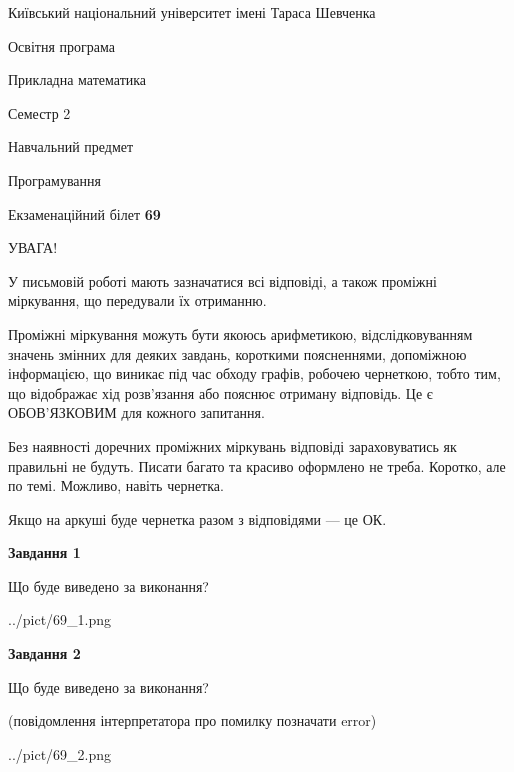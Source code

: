 \documentclass[12pt, ukrainian]{article}
\begin{document}
{{\begin {small}\par
{ \center  Київський національний університет імені Тараса Шевченка \par}
{\parbox {5 cm}{Освітня програма \hfill}{\parbox {7 cm}{Прикладна математика\hfill}}\parbox {6 cm}{\hfill Семестр 2}}\par
{\parbox {5 cm} {Навчальний предмет \hfill}\parbox {7 cm}{Програмування \hfill}\parbox {6cm}{\hfill}\par}\vspace{-7pt} \end{small}}{\center Екзаменаційний білет \No \textbf
{ 69 }\par}}
{
\begin {large}
УВАГА!

У письмовій роботі мають зазначатися всі відповіді, а також проміжні міркування, що передували їх отриманню.

Проміжні міркування можуть бути якоюсь арифметикою, відслідковуванням зна\-чень змінних для деяких завдань,
короткими поясненнями, допоміжною інформацією, що виникає під час обходу графів, робочею чернеткою,
тобто тим, що відображає хід розв’язання або пояснює отриману відповідь.
Це є ОБОВ’ЯЗКОВИМ для кожного запитання.

Без наявності доречних проміжних міркувань відповіді зараховуватись як правиль\-ні не будуть.
Писати багато та красиво оформлено не треба. Коротко, але по темі. Можли\-во, навіть чернетка.

Якщо на аркуші буде чернетка разом з відповідями --- це ОК.

\newpage

{\begin {center}\textbf{Завдання 1}\end {center}}\par
Що буде виведено за виконання?\par
\begin{center}
	{../pict/69_1.png}
\end{center}
\newpage

{\begin {center}\textbf{Завдання 2}\end {center}}\par
Що буде виведено за виконання?\par
 (повідомлення інтерпретатора про помилку позначати error)\par
\begin{center}
	{../pict/69_2.png}
\end{center}
\newpage


\end{large}}
\end{document}
